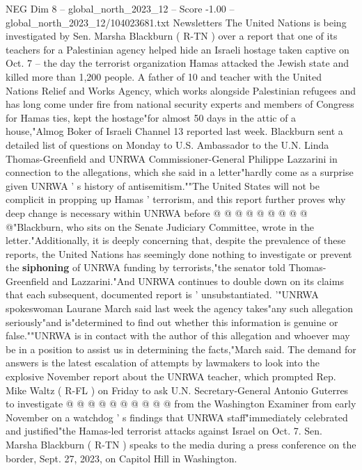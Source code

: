 \begin{textsample}{NEG Dim 8 – global\_north\_2023\_12 – Score -1.00 – global\_north\_2023\_12/104023681.txt}  \label{ex:f8_neg_342}
Newsletters The United Nations is being investigated by Sen.
Marsha Blackburn ( R-TN ) over a report that one of its teachers for a Palestinian agency helped hide an Israeli hostage taken captive on Oct. 7 -- the day the terrorist organization Hamas attacked the Jewish state and killed more than 1,200 people.
A father of 10 and teacher with the United Nations Relief and Works Agency, which works alongside Palestinian refugees and has long come under fire from national security experts and members of Congress for Hamas ties, kept the hostage"for almost 50 days in the attic of a house,"Almog Boker of Israeli Channel 13 reported last week.
Blackburn sent a detailed list of questions on Monday to U.S.
Ambassador to the U.N.
Linda Thomas-Greenfield and UNRWA Commissioner-General Philippe Lazzarini in connection to the allegations, which she said in a letter"hardly come as a surprise given UNRWA ' s history of antisemitism.""The United States will not be complicit in propping up Hamas ' terrorism, and this report further proves why deep change is necessary within UNRWA before @ @ @ @ @ @ @ @ @ @"Blackburn, who sits on the Senate Judiciary Committee, wrote in the letter."Additionally, it is deeply concerning that, despite the prevalence of these reports, the United Nations has seemingly done nothing to investigate or prevent the \textbf{siphoning} of UNRWA funding by terrorists,"the senator told Thomas-Greenfield and Lazzarini."And UNRWA continues to double down on its claims that each subsequent, documented report is ' unsubstantiated. '"UNRWA spokeswoman Laurane March said last week the agency takes"any such allegation seriously"and is"determined to find out whether this information is genuine or false.""UNRWA is in contact with the author of this allegation and whoever may be in a position to assist us in determining the facts,"March said.
The demand for answers is the latest escalation of attempts by lawmakers to look into the explosive November report about the UNRWA teacher, which prompted Rep.
Mike Waltz ( R-FL ) on Friday to ask U.N.
Secretary-General Antonio Guterres to investigate @ @ @ @ @ @ @ @ @ @ from the Washington Examiner from early November on a watchdog ' s findings that UNRWA staff"immediately celebrated and justified"the Hamas-led terrorist attacks against Israel on Oct. 7.
Sen.
Marsha Blackburn ( R-TN ) speaks to the media during a press conference on the border, Sept. 27, 2023, on Capitol Hill in Washington.

\end{textsample}
